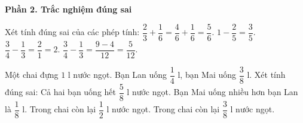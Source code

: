 \textbf{Phần 2. Trắc nghiệm đúng sai}

\begin{ex} %
Xét tính đúng sai của các phép tính:
\choiceTF
{\True $\dfrac{2}{3} + \dfrac{1}{6} = \dfrac{4}{6} + \dfrac{1}{6} = \dfrac{5}{6}$.}
{\True $1 - \dfrac{2}{5} = \dfrac{3}{5}$.}
{$\dfrac{3}{4} - \dfrac{1}{3} = \dfrac{2}{1} = 2$.}
{\True $\dfrac{3}{4} - \dfrac{1}{3} = \dfrac{9 - 4}{12} = \dfrac{5}{12}$.}
\end{ex}

\begin{ex} %
Một chai đựng $1\text{ l}$ nước ngọt. Bạn Lan uống $\dfrac{1}{4}\text{ l}$, bạn Mai uống $\dfrac{3}{8}\text{ l}$. Xét tính đúng sai:
\choiceTF
{\True Cả hai bạn uống hết $\dfrac{5}{8}\text{ l}$ nước ngọt.}
{\True Bạn Mai uống nhiều hơn bạn Lan là $\dfrac{1}{8}\text{ l}$.}
{Trong chai còn lại $\dfrac{1}{2}\text{ l}$ nước ngọt.}
{\True Trong chai còn lại $\dfrac{3}{8}\text{ l}$ nước ngọt.}
\end{ex}

